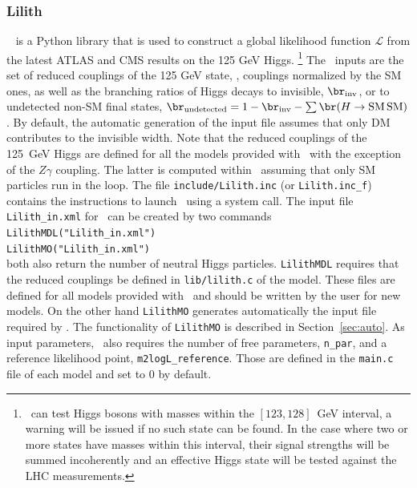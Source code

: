 \documentclass[12pt,a4paper]{article}
\begin{document}
\subsubsection{Lilith}\label{sec:lilith}


\lilith~\cite{Bernon:2015hsa} is a Python library that is used to construct a global likelihood function $\mathcal{L}$  from the latest ATLAS and CMS results on the 125 GeV Higgs. 
\footnote{\lilith\ can test Higgs bosons with masses within the $[123, 128]$~GeV interval, a warning will be issued if no such state can be found. In the case where two or more states have masses within this interval, their signal strengths will be summed incoherently and an effective Higgs state will be tested against the LHC measurements.}
The \lilith\ inputs are the set of reduced couplings of the 125 GeV state, \ie, couplings normalized by the SM ones, as well as the  branching ratios of Higgs decays to invisible, $\br_{\rm inv}$, or to undetected non-SM final states,
$\br_{\rm undetected}=1-\br_{\rm inv}-\sum \br(H\rightarrow {\rm SM \,SM})$. 
By default, the automatic generation of the input file assumes that only DM contributes to the invisible width. 
Note that the reduced couplings of the 125~GeV Higgs are defined for all the models provided with \micro\ with the exception of the $Z\gamma$ coupling. The latter is computed within \lilith\ assuming that only SM particles run in the loop. 
The file \verb|include/Lilith.inc| (or \verb|Lilith.inc_f|) contains the instructions to launch \lilith\ using a system call. 
The input file  \verb|Lilith_in.xml| for \lilith\ can be created by two  commands\\

\noindent
\verb|LilithMDL("Lilith_in.xml")|\\
\verb|LilithMO("Lilith_in.xml")|\\

\noindent 
both also return the number of neutral Higgs particles.  
\verb|LilithMDL| requires that the  reduced couplings be defined in \verb|lib/lilith.c| of the model. These files are defined for all models provided with \micro\ and should be written by the user for new models. On the other hand \verb|LilithMO|  generates automatically the input file required by \lilith.
The functionality of \verb|LilithMO| is described in Section~\ref{sec:auto}. As input parameters, \lilith\ also requires 
 the number of free parameters, \verb|n_par|, and  a reference likelihood point, \verb|m2logL_reference|. Those are defined in the \verb|main.c| file of each model and set to 0 by default.
\end{document}
